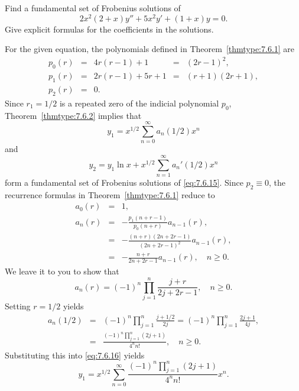 \documentclass{ximera}
\begin{document}
\begin{example}\label{example:7.6.2}
Find a fundamental set of Frobenius  solutions of
\begin{equation} \label{eq:7.6.15}
2x^2(2+x)y''+5x^2y'+(1+x)y=0.
\end{equation}
Give explicit formulas for the coefficients in the solutions.

\begin{explanation}
For  the given equation, the polynomials defined in
Theorem~\ref{thmtype:7.6.1} are
$$
\begin{array}{cclcl}
p_0(r)&=&4r(r-1)+1&=&(2r-1)^2,\\
p_1(r)&=&2r(r-1)+5r+1&=&(r+1)(2r+1),\\
p_2(r)&=&0.
\end{array}
$$
Since $r_1=1/2$ is a repeated zero of the  indicial polynomial $p_0$,
Theorem~\ref{thmtype:7.6.2} implies that
\begin{equation} \label{eq:7.6.16}
y_1=x^{1/2}\sum_{n=0}^\infty  a_n(1/2)x^n
\end{equation}
and
\begin{equation} \label{eq:7.6.17}
y_2=y_1\ln x+x^{1/2}\sum_{n=1}^\infty a_n'(1/2)x^n
\end{equation}
form a fundamental set of Frobenius solutions of \eqref{eq:7.6.15}.
Since $p_2\equiv0$, the recurrence formulas in Theorem~\ref{thmtype:7.6.1}
 reduce to
$$
\begin{array}{ccl}
a_0(r)&=&1,\\
a_n(r)&=&-\frac{p_1(n+r-1)}{p_0(n+r)}a_{n-1}(r),\\
&=&-\frac{(n+r)(2n+2r-1)}{(2n+2r-1)^2}a_{n-1}(r),\\
&=&-\frac{n+r}{2n+2r-1}a_{n-1}(r),\quad n\geq 0.
\end{array}
$$
We leave it to you to show that
\begin{equation} \label{eq:7.6.18}
a_n(r)=(-1)^n\prod_{j=1}^n\frac{j+r}{2j+2r-1},\quad n\geq 0.
\end{equation}
Setting $r=1/2$  yields
\begin{equation} \label{eq:7.6.19}
\begin{array}{ccl}
a_n(1/2)&=&(-1)^n\prod_{j=1}^n\frac{j+1/2}{2j}=
(-1)^n\prod_{j=1}^n\frac{2j+1}{4j},\\
&=&\frac{(-1)^n\prod_{j=1}^n(2j+1)}{4^nn!},\quad n\geq 0.
\end{array}
\end{equation}
Substituting this into \eqref{eq:7.6.16} yields
$$
y_1=x^{1/2}\sum_{n=0}^\infty\frac{(-1)^n\prod_{j=1}^n(2j+1)}{4^nn!}x^n.
$$


\end{explanation}
\end{example}
\end{document}
